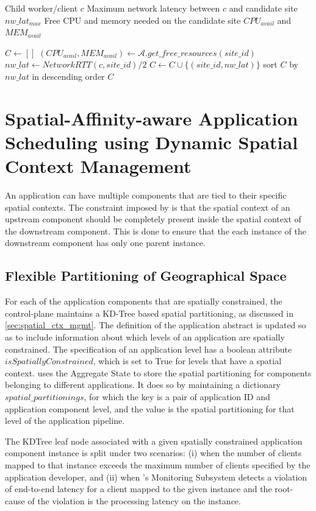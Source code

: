 \begin{algorithm}
\caption{$get\_candidate\_sites$}
\label{algo:get_candidate_sites}
\begin{algorithmic}[1]
\Require Child worker/client $c$
\Require Maximum network latency between $c$ and candidate site $nw\_lat_{max}$
\Require Free CPU and memory needed on the candidate site $CPU_{avail}$ and $MEM_{avail}$

\State $C \gets []$
    \State $\left( CPU_{avail}, MEM_{avail}\right) \gets \mathcal{A}.get\_free\_resources \left( site\_id \right)$
    \State $nw\_lat \gets NetworkRTT \left( c, site\_id\right)/2$
        \State $C \gets C \cup \{ \left( site\_id, nw\_lat \right) \}$
    \EndIf
\EndFor
\State sort $C$ by $nw\_lat$ in descending order
\State \Return $C$

\end{algorithmic}
\end{algorithm}

\section{Spatial-Affinity-aware Application Scheduling using Dynamic Spatial Context Management}
An application can have multiple components that are tied to their specific spatial contexts. The constraint imposed by \oneedge{} is that the spatial context of an upstream component should be completely present inside the spatial context of the downstream component. This is done to ensure that the each instance of the downstream component has only one parent instance. 
\subsection{Flexible Partitioning of Geographical Space}
For each of the application components that are spatially constrained, the control-plane maintains a KD-Tree based spatial partitioning, as discussed in \cref{sec:spatial_ctx_mgmt}. The definition of the application abstract is updated so as to include information about which levels of an application are spatially constrained. The specification of an application level has a boolean attribute $isSpatiallyConstrained$, which is set to True for levels that have a spatial context. \oneedge{} uses the Aggregate State to store the spatial partitioning for components belonging to different applications. It does so by maintaining a dictionary $spatial\_partitionings$, for which the key is a pair of application ID and application component level, and the value is the spatial partitioning for that level of the application pipeline.
\par The KDTree leaf node associated with a given spatially constrained application component instance is split under two scenarios: (i) when the number of clients mapped to that instance exceeds the maximum number of clients specified by the application developer, and (ii) when \oneedge{}'s Monitoring Subsystem detects a violation of end-to-end latency for a client mapped to the given instance and the root-cause of the violation is the processing latency on the instance.

